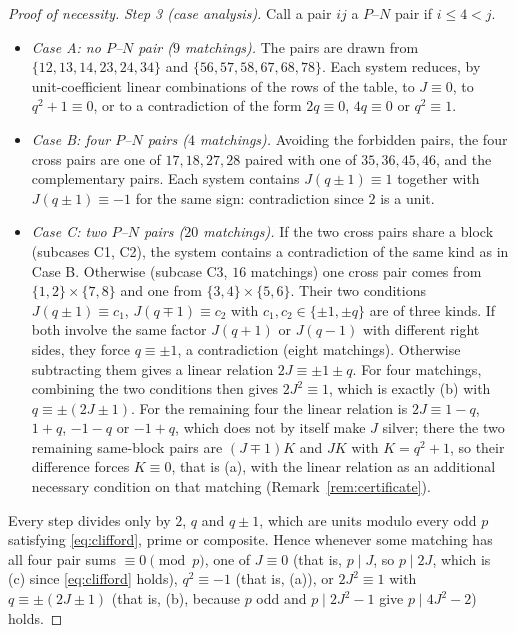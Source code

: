 \documentclass[11pt]{article}
\theoremstyle{definition}
\begin{document}
\begin{proof}[Proof of necessity]
\emph{Step 3 (case analysis).}  Call a pair $ij$ a $P$--$N$ pair if
$i\leq4<j$.
\begin{itemize}
\item \emph{Case A: no $P$--$N$ pair ($9$ matchings).}  The pairs are
drawn from $\{12,13,14,23,24,34\}$ and $\{56,57,58,67,68,78\}$.  Each
system reduces, by unit-coefficient linear combinations of the rows of
the table, to $J\equiv0$, to $q^2+1\equiv0$, or to a contradiction of the
form $2q\equiv0$, $4q\equiv0$ or $q^2\equiv1$.
\item \emph{Case B: four $P$--$N$ pairs ($4$ matchings).}  Avoiding the
forbidden pairs, the four cross pairs are one of $17,18,27,28$ paired
with one of $35,36,45,46$, and the complementary pairs.  Each system
contains $J(q\pm1)\equiv1$ together with $J(q\pm1)\equiv-1$ for the same
sign: contradiction since $2$ is a unit.
\item \emph{Case C: two $P$--$N$ pairs ($20$ matchings).}  If the two
cross pairs share a block (subcases C1, C2), the system contains a
contradiction of the same kind as in Case B.  Otherwise (subcase C3, $16$
matchings) one cross pair comes from $\{1,2\}\times\{7,8\}$ and one from
$\{3,4\}\times\{5,6\}$.  Their two conditions $J(q\pm1)\equiv c_1$,
$J(q\mp1)\equiv c_2$ with $c_1,c_2\in\{\pm1,\pm q\}$ are of three kinds.
If both involve the same factor $J(q+1)$ or $J(q-1)$ with different
right sides, they force $q\equiv\pm1$, a contradiction (eight
matchings).  Otherwise subtracting them gives a linear relation
$2J\equiv\pm1\pm q$.  For four matchings, combining the two conditions
then gives $2J^2\equiv1$, which is exactly (b) with $q\equiv\pm(2J\pm1)$.
For the remaining four the linear relation is $2J\equiv1-q$, $1+q$,
$-1-q$ or $-1+q$, which does not by itself make $J$ silver; there the
two remaining same-block pairs are $(J\mp1)K$ and $JK$ with $K=q^2+1$,
so their difference forces $K\equiv0$, that is (a), with the linear
relation as an additional necessary condition on that matching
(Remark~\ref{rem:certificate}).
\end{itemize}
Every step divides only by $2$, $q$ and $q\pm1$, which are units modulo
every odd $p$ satisfying \eqref{eq:clifford}, prime or composite.  Hence
whenever some matching has all four pair sums $\equiv0\pmod p$, one of
$J\equiv0$ (that is, $p\mid J$, so $p\mid2J$, which is (c) since
\eqref{eq:clifford} holds), $q^2\equiv-1$ (that is, (a)), or
$2J^2\equiv1$ with $q\equiv\pm(2J\pm1)$ (that is, (b), because $p$ odd
and $p\mid2J^2-1$ give $p\mid4J^2-2$) holds.
\end{proof}
\end{document}
